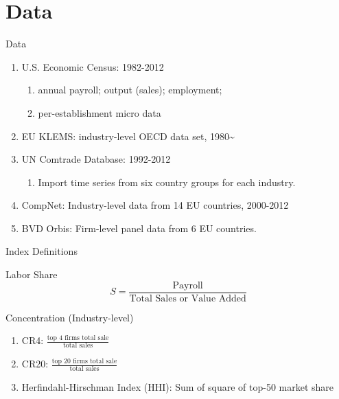 \documentclass[
  10pt,
  ignorenonframetext,
  aspectratio=43,
]{beamer}
\providecommand{\tightlist}{%
  \setlength{\itemsep}{0pt}\setlength{\parskip}{0pt}}
\begin{document}
\hypertarget{data}{%
\section{Data}\label{data}}

\begin{frame}{Data}
\begin{enumerate}
\tightlist
\item
  U.S. Economic Census: 1982-2012

  \begin{enumerate}
  \tightlist
  \item
    annual payroll; output (sales); employment;
  \item
    per-establishment micro data
  \end{enumerate}
\item
  EU KLEMS: industry-level OECD data set, 1980\textasciitilde{}
\item
  UN Comtrade Database: 1992-2012

  \begin{enumerate}
  \tightlist
  \item
    Import time series from six country groups for each industry.
  \end{enumerate}
\item
  CompNet: Industry-level data from 14 EU countries, 2000-2012
\item
  BVD Orbis: Firm-level panel data from 6 EU countries.
\end{enumerate}
\end{frame}

\begin{frame}{Index Definitions}
\protect\hypertarget{index-definitions}{}
\begin{block}{Labor Share}
\protect\hypertarget{labor-share}{}
\[
S = \frac{\text{Payroll}}{\text{Total Sales or Value Added}}
\]
\end{block}

\begin{block}{Concentration (Industry-level)}
\protect\hypertarget{concentration-industry-level}{}
\begin{enumerate}
\tightlist
\item
  CR4: \(\frac{\text{top 4 firms total sale}}{\text{total sales}}\)
\item
  CR20: \(\frac{\text{top 20 firms total sale}}{\text{total sales}}\)
\item
  Herfindahl-Hirschman Index (HHI): Sum of square of top-50 market share
\end{enumerate}
\end{block}
\end{frame}
\end{document}
